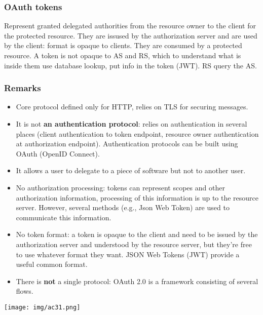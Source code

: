 \documentclass[a4paper, 10pt, titlepage]{article}
\begin{document}
\subsubsection{OAuth tokens}
Represent granted delegated authorities from the resource owner to the client for the protected resource. They are issused by the authorization server and are used by the client: format is opaque to clients. They are consumed by a protected resource. A token is not opaque to AS and RS, which to understand what is inside them use database lookup, put info in the token (JWT). RS query the AS.

\subsubsection{Remarks}
\begin{itemize}
\item Core protocol defined only for HTTP, relies on TLS for securing messages.
\item It is not \textbf{an authentication protocol}: relies on authentication in several places (client authentication to token endpoint, resource owner authentication at authorization endpoint). Authentication protocols can be built using OAuth (OpenID Connect).
\item It allows a user to delegate to a piece of software but not to another user.
\item No authorization processing: tokens can represent scopes and other authorization information, processing of this information is up to the resource server. However, several methods (e.g., Json Web Token) are used to communicate this information.
\item No token format: a token is opaque to the client and need to be issued by the authorization server and understood by the resource server, but they’re free to use whatever format they want. JSON Web Tokens (JWT) provide a useful common format.
\item There is \textbf{not} a single protocol: OAuth 2.0 is a framework consisting of several flows.
\end{itemize}
\begin{center}
\texttt{[image: img/ac31.png]}
\end{center}
\end{document}
